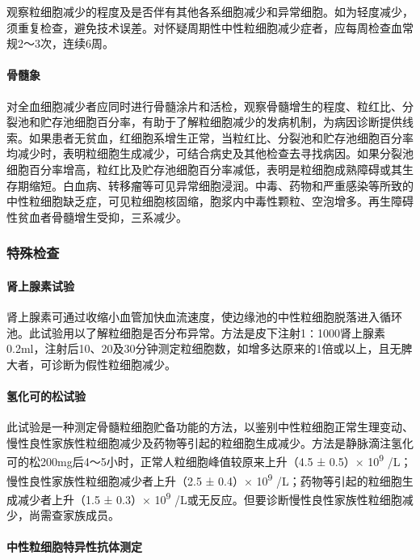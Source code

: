 观察粒细胞减少的程度及是否伴有其他各系细胞减少和异常细胞。如为轻度减少，须重复检查，避免技术误差。对怀疑周期性中性粒细胞减少症者，应每周检查血常规2～3次，连续6周。

\paragraph{骨髓象}

对全血细胞减少者应同时进行骨髓涂片和活检，观察骨髓增生的程度、粒红比、分裂池和贮存池细胞百分率，有助于了解粒细胞减少的发病机制，为病因诊断提供线索。如果患者无贫血，红细胞系增生正常，当粒红比、分裂池和贮存池细胞百分率均减少时，表明粒细胞生成减少，可结合病史及其他检查去寻找病因。如果分裂池细胞百分率增高，粒红比及贮存池细胞百分率减低，表明是粒细胞成熟障碍或其生存期缩短。白血病、转移瘤等可见异常细胞浸润。中毒、药物和严重感染等所致的中性粒细胞缺乏症，可见粒细胞核固缩，胞浆内中毒性颗粒、空泡增多。再生障碍性贫血者骨髓增生受抑，三系减少。

\subsubsection{特殊检查}

\paragraph{肾上腺素试验}

肾上腺素可通过收缩小血管加快血流速度，使边缘池的中性粒细胞脱落进入循环池。此试验用以了解粒细胞是否分布异常。方法是皮下注射1∶1000肾上腺素0.2ml，注射后10、20及30分钟测定粒细胞数，如增多达原来的1倍或以上，且无脾大者，可诊断为假性粒细胞减少。

\paragraph{氢化可的松试验}

此试验是一种测定骨髓粒细胞贮备功能的方法，以鉴别中性粒细胞正常生理变动、慢性良性家族性粒细胞减少及药物等引起的粒细胞生成减少。方法是静脉滴注氢化可的松200mg后4～5小时，正常人粒细胞峰值较原来上升（4.5
± 0.5）× 10\textsuperscript{9} /L；慢性良性家族性粒细胞减少者上升（2.5 ±
0.4）× 10\textsuperscript{9} /L；药物等引起的粒细胞生成减少者上升（1.5 ±
0.3）× 10\textsuperscript{9}
/L或无反应。但要诊断慢性良性家族性粒细胞减少，尚需查家族成员。

\paragraph{中性粒细胞特异性抗体测定}

